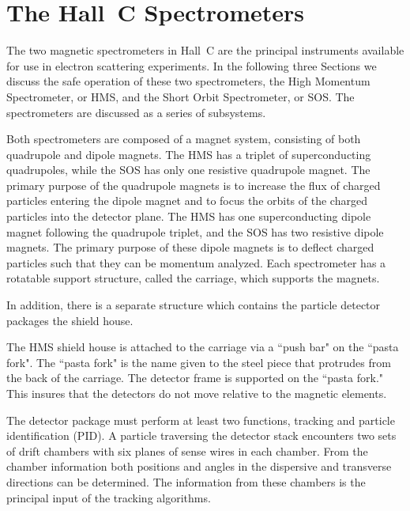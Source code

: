 

\section{The Hall~C Spectrometers}


	The two magnetic spectrometers in Hall~C are the principal instruments
available for use in electron scattering experiments. In the following three
Sections we discuss the safe operation of these two spectrometers,
the High Momentum Spectrometer, or HMS,
and the Short Orbit Spectrometer, or SOS. The spectrometers are
discussed as a series of subsystems.

Both spectrometers are composed of a magnet system, consisting of both
quadrupole and dipole magnets. The HMS has a triplet of superconducting
quadrupoles, while the SOS has only one resistive quadrupole magnet.
The primary purpose of the quadrupole magnets is to increase the flux of
charged particles entering the dipole magnet and to focus the orbits of the
charged particles into the detector plane.
The HMS has one superconducting dipole magnet following the quadrupole triplet,
and the SOS has two resistive dipole magnets. The primary purpose of these
dipole magnets is to deflect charged particles such that they can be momentum
analyzed.
Each spectrometer has a rotatable support structure, called the
carriage, which supports the magnets.

In addition, there is a separate
structure which contains the particle detector packages the shield house.

The HMS shield house is attached to the carriage via a ``push bar" on the ``pasta
fork".  The ``pasta fork" is the name given to the steel piece that protrudes
from the back of the carriage. The detector frame is supported on the
``pasta fork." This insures that the detectors do not move relative
to the magnetic elements.

The detector package must perform at least two functions, tracking and
particle identification (PID). A particle traversing the detector stack
encounters two sets of drift chambers with six planes of sense
wires in each chamber. From the chamber information both positions
and angles in the dispersive and transverse directions can be determined.
The information from these chambers is the principal input
of the tracking algorithms.

